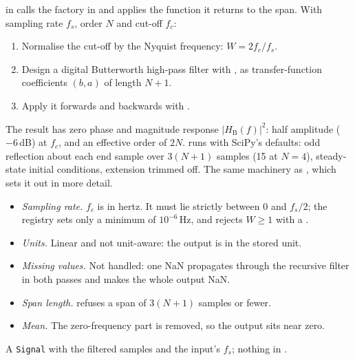  in  calls the factory
 in  and applies
the function it returns to the span. With sampling rate $f_s$, order $N$ and cut-off $f_c$:
\begin{enumerate}
\item Normalise the cut-off by the Nyquist frequency: $W = 2f_c/f_s$.
\item Design a digital Butterworth high-pass filter \citep{butterworth1930theory} with
   \citep{virtanen2020scipy}, as
  transfer-function coefficients $(b, a)$ of length $N+1$.
\item Apply it forwards and backwards with .
\end{enumerate}
The result has zero phase and magnitude response $|H_\mathrm{B}(f)|^2$: half amplitude
($-6$\,dB) at $f_c$, and an effective order of $2N$.  runs with SciPy's
defaults: odd reflection about each end sample over $3(N+1)$ samples (15 at $N = 4$),
steady-state initial conditions, extension trimmed off. The same machinery as
, which sets it out in more detail.

\begin{itemize}
\item \emph{Sampling rate.} $f_c$ is in hertz. It must lie strictly between 0 and $f_s/2$;
  the registry sets only a minimum of $10^{-6}$\,Hz, and  rejects
  $W \geq 1$ with a .
\item \emph{Units.} Linear and not unit-aware: the output is in the stored unit.
\item \emph{Missing values.} Not handled: one NaN propagates through the recursive filter in
  both passes and makes the whole output NaN. 
\item \emph{Span length.}  refuses a span of $3(N+1)$ samples or fewer.
\item \emph{Mean.} The zero-frequency part is removed, so the output sits near zero.
\end{itemize}

A \texttt{Signal} with the filtered samples and the input's $f_s$; nothing in .

